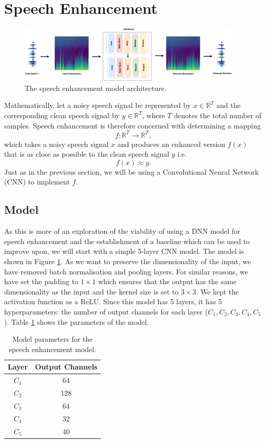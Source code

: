 \documentclass[logo,bsc,singlespacing,parskip,online]{infthesis}
\begin{document}
\section{Speech Enhancement}
\label{sec:methodology-se}
\begin{figure}[h]
   \centering
   \includegraphics[width=0.95\textwidth]{se-model-diagram.png}
   \caption{The speech enhancement model architecture.}
   \label{fig:speech-enhancement-model-architecture}
\end{figure}
Mathematically, let a noisy speech signal be represented by \(x \in \mathbb{R}^{T}\) and the corresponding clean speech signal by \(y \in \mathbb{R}^{T}\), where \(T\) denotes the total number of samples.
Speech enhancement is therefore concerned with determining a mapping 
\[
f: \mathbb{R}^{T} \to \mathbb{R}^{T},
\]
which takes a noisy speech signal \(x\) and produces an enhanced version \(f(x)\) that is as close as possible to the clean speech signal \(y\) i.e.
\[
f(x) \approx y.
\]
Just as in the previous section, we will be using a Convolutional Neural Network (CNN) to implement \(f\).
\subsection{Model}
\label{sec:se-model}
As this is more of an exploration of the viability of using a DNN model for speech enhancement 
and the establishment of a baseline which can be used to improve upon, we will start 
with a simple 5-layer CNN model. The model is shown in Figure \ref{fig:speech-enhancement-model-architecture}.
As we want to preserve the dimensionality of the input, we 
have removed batch normalisation and pooling layers.
For similar reasons, we have set the padding to $1\times 1$ which ensures that the output has the same dimensionality as the input
and the kernel size is set to $3\times 3$. We kept the activation function as a ReLU.
Since this model has 5 layers, it has 5 hyperparameters: the number of output channels for each layer ($C_1, C_2, C_3, C_4, C_5$).
Table \ref{tab:speech-enhancement-model-params} shows the parameters of the model.

\begin{table}[h]
   \centering
   \begin{tabular}{|c|c|}
      \hline
      Layer & Output Channels \\
      \hline
      $C_1$ & 64 \\
      $C_2$ & 128 \\
      $C_3$ & 64 \\
      $C_4$ & 32 \\
      $C_5$ & 40 \\
      \hline
   \end{tabular}
   \caption{Model parameters for the speech enhancement model.}
   \label{tab:speech-enhancement-model-params}
\end{table}
\end{document}
